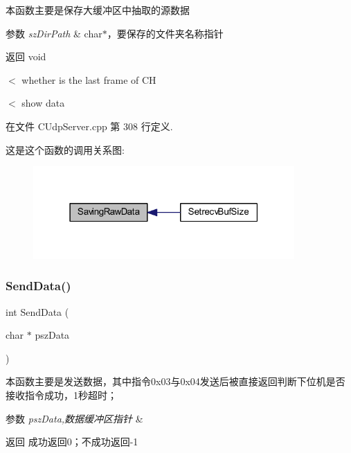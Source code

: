 本函数主要是保存大缓冲区中抽取的源数据 


\begin{DoxyParams}{参数}
{\em sz\+Dir\+Path} & char$\ast$，要保存的文件夹名称指针 \\
\hline
\end{DoxyParams}
\begin{DoxyReturn}{返回}
void 
\end{DoxyReturn}
$<$ whether is the last frame of CH

$<$ show data 

在文件 C\+Udp\+Server.\+cpp 第 308 行定义.

这是这个函数的调用关系图\+:\nopagebreak
\begin{figure}[H]
\begin{center}
\leavevmode
\includegraphics[width=283pt]{class_c_udp_server_a47ad892f309e7274cc2938c7cee7ba1f_icgraph}
\end{center}
\end{figure}
\mbox{\label{class_c_udp_server_a7372271e50c6806763777245c6a0a2b8}} 
\subsubsection{\texorpdfstring{Send\+Data()}{SendData()}}
{\footnotesize\ttfamily int Send\+Data (\begin{DoxyParamCaption}\item[{char $\ast$}]{psz\+Data }\end{DoxyParamCaption})}



本函数主要是发送数据，其中指令0x03与0x04发送后被直接返回判断下位机是否接收指令成功，1秒超时； 


\begin{DoxyParams}{参数}
{\em psz\+Data,数据缓冲区指针} & \\
\hline
\end{DoxyParams}
\begin{DoxyReturn}{返回}
成功返回0；不成功返回-\/1 
\end{DoxyReturn}


